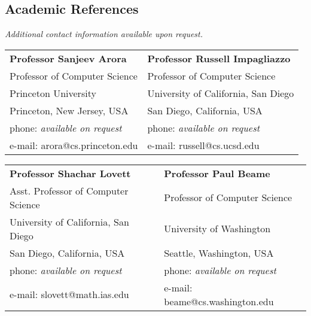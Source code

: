 \documentclass[margin,line]{resume}
\begin{document}
\begin{resume}
\newpage
\section{\mysidestyle Academic References} 
\emph{Additional contact information available upon request.}

\begin{tabular}{@{}p{6cm}p{6cm}}
\textbf{Professor Sanjeev Arora}        &  \textbf{Professor Russell Impagliazzo}   \\
Professor of Computer Science           &  Professor of Computer Science            \\
Princeton University                    &  University of California, San Diego      \\
Princeton, New Jersey, USA              &  San Diego, California, USA               \\
phone: \textsl{available on request}    &  phone: \textsl{available on request}     \\
e-mail: arora@cs.princeton.edu        &  e-mail: russell@cs.ucsd.edu    \\
\end{tabular}

\begin{tabular}{@{}p{6cm}p{6cm}}
\textbf{Professor Shachar Lovett}    &  \textbf{Professor Paul Beame}        \\
Asst. Professor of Computer Science   &  Professor of Computer Science                 \\
University of California, San Diego       &  University of Washington       \\
San Diego, California, USA                           &  Seattle, Washington, USA                \\
phone: \textsl{available on request}    &  phone: \textsl{available on request}     \\
e-mail: slovett@math.ias.edu           &  e-mail: beame@cs.washington.edu    \\
\end{tabular}



\end{resume}
\end{document}
